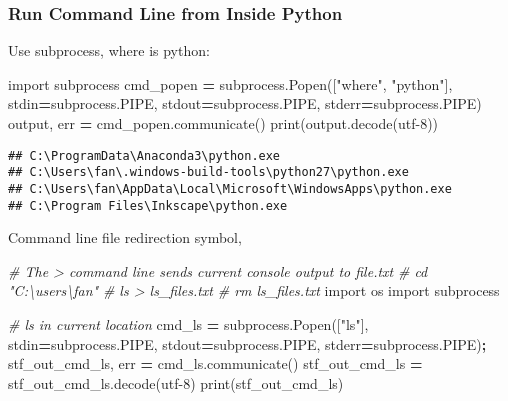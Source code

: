 \documentclass[
]{book}
\newenvironment{Shaded}{\begin{snugshade}}{\end{snugshade}}
\newcommand{\BuiltInTok}[1]{#1}
\newcommand{\CommentTok}[1]{\textcolor[rgb]{0.56,0.35,0.01}{\textit{#1}}}
\newcommand{\ImportTok}[1]{#1}
\newcommand{\NormalTok}[1]{#1}
\newcommand{\OperatorTok}[1]{\textcolor[rgb]{0.81,0.36,0.00}{\textbf{#1}}}
\newcommand{\StringTok}[1]{\textcolor[rgb]{0.31,0.60,0.02}{#1}}
\begin{document}
\hypertarget{run-command-line-from-inside-python}{%
\subsubsection{Run Command Line from Inside Python}\label{run-command-line-from-inside-python}}

Use subprocess, where is python:

\begin{Shaded}
\begin{Highlighting}[]
\ImportTok{import}\NormalTok{ subprocess}
\NormalTok{cmd\_popen }\OperatorTok{=}\NormalTok{ subprocess.Popen([}\StringTok{"where"}\NormalTok{, }\StringTok{"python"}\NormalTok{],}
\NormalTok{                             stdin}\OperatorTok{=}\NormalTok{subprocess.PIPE,}
\NormalTok{                             stdout}\OperatorTok{=}\NormalTok{subprocess.PIPE,}
\NormalTok{                             stderr}\OperatorTok{=}\NormalTok{subprocess.PIPE)}
\NormalTok{output, err }\OperatorTok{=}\NormalTok{ cmd\_popen.communicate()}
\BuiltInTok{print}\NormalTok{(output.decode(}\StringTok{\textquotesingle{}utf{-}8\textquotesingle{}}\NormalTok{))}
\end{Highlighting}
\end{Shaded}

\begin{verbatim}
## C:\ProgramData\Anaconda3\python.exe
## C:\Users\fan\.windows-build-tools\python27\python.exe
## C:\Users\fan\AppData\Local\Microsoft\WindowsApps\python.exe
## C:\Program Files\Inkscape\python.exe
\end{verbatim}

Command line file redirection symbol,

\begin{Shaded}
\begin{Highlighting}[]
\CommentTok{\# The \textgreater{} command line sends current console output to file.txt}
\CommentTok{\# cd "C:\textbackslash{}users\textbackslash{}fan"}
\CommentTok{\# ls \textgreater{} ls\_files.txt}
\CommentTok{\# rm ls\_files.txt}
\ImportTok{import}\NormalTok{ os }
\ImportTok{import}\NormalTok{ subprocess }

\CommentTok{\# ls in current location}
\NormalTok{cmd\_ls }\OperatorTok{=}\NormalTok{ subprocess.Popen([}\StringTok{"ls"}\NormalTok{], stdin}\OperatorTok{=}\NormalTok{subprocess.PIPE, stdout}\OperatorTok{=}\NormalTok{subprocess.PIPE, stderr}\OperatorTok{=}\NormalTok{subprocess.PIPE)}\OperatorTok{;}
\NormalTok{stf\_out\_cmd\_ls, err }\OperatorTok{=}\NormalTok{ cmd\_ls.communicate()}
\NormalTok{stf\_out\_cmd\_ls }\OperatorTok{=}\NormalTok{ stf\_out\_cmd\_ls.decode(}\StringTok{\textquotesingle{}utf{-}8\textquotesingle{}}\NormalTok{)}
\BuiltInTok{print}\NormalTok{(stf\_out\_cmd\_ls)}
\end{Highlighting}
\end{Shaded}
\end{document}
